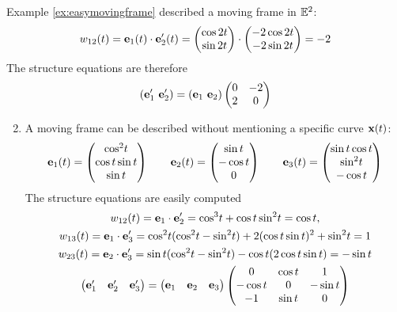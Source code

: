 \begin{examples}{}{}
	\exstart Example \ref{ex:easymovingframe} described a moving frame in $\mathbb{E}^2$:
	\[
		w_{12}(t)={\mathbf{e}}_1(t)\cdot {\mathbf{e}}_2'(t)=\begin{pmatrix}\cos 2t\\\sin 2t\end{pmatrix}\cdot\begin{pmatrix}-2\cos 2t\\-2\sin 2t\end{pmatrix}=-2
	\]
	The structure equations are therefore
	\[
	(\ve_1'\ \ve_2')=(\ve_1\ \ve_2)
	\begin{pmatrix}
		0&-2\\
		2&0
	\end{pmatrix}
	\]
	\begin{enumerate}\setcounter{enumi}{1}
		\item A moving frame can be described without mentioning a specific curve ${\mathbf{x}}(t)$:
		\[
			{\mathbf{e}}_1(t) =\begin{pmatrix}\cos^2\!t\\\cos t\sin t\\\sin t\end{pmatrix}\qquad {\mathbf{e}}_2(t) =\begin{pmatrix}\sin t\\-\cos t\\0\end{pmatrix}\qquad {\mathbf{e}}_3(t) =\begin{pmatrix}\sin t\cos t\\\sin^2\!t\\-\cos t\end{pmatrix}
		\]
		The structure equations are easily computed
		\begin{gather*}
			w_{12}(t) =\ve_1\cdot\ve_2' =\cos^3\!t+\cos t\sin^2\!t =\cos t,\\
			w_{13}(t) =\ve_1\cdot\ve_3' =\cos^2\!t(\cos^2\!t-\sin^2\!t)+2(\cos t\sin t)^2+\sin^2\!t =1\\
			w_{23}(t) =\ve_2\cdot\ve_3' =\sin t(\cos^2\!t-\sin^2\!t)-\cos t(2\cos t\sin t) =-\sin t\\
			\begin{pmatrix}
	  		\ve_1'&\ve_2'&\ve_3'
	  	\end{pmatrix}
	  	=
			\begin{pmatrix}
				\ve_1&\ve_2&\ve_3
			\end{pmatrix}
			\begin{pmatrix}
				0&\cos t&1\\
				-\cos t&0&-\sin t\\
				-1&\sin t&0
			\end{pmatrix}
		\end{gather*}
	\end{enumerate}
\end{examples}


